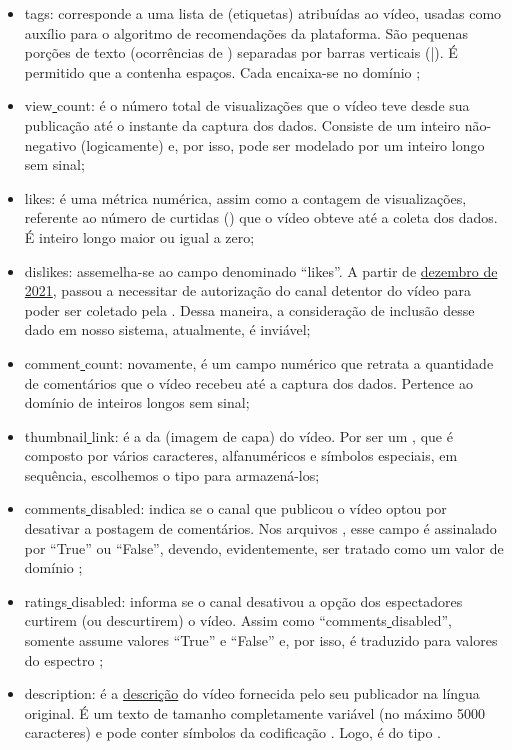 \begin{enumerate}
\begin{itemize}
    \item tags: corresponde a uma lista de  (etiquetas) atribuídas ao vídeo, usadas como auxílio para o algoritmo de recomendações da plataforma. São pequenas porções de texto (ocorrências de ) separadas por barras verticais (|). É permitido que a  contenha espaços. Cada  encaixa-se no domínio ;
    \item view\underline{ }count: é o número total de visualizações que o vídeo teve desde sua publicação até o instante da captura dos dados. Consiste de um inteiro não-negativo (logicamente) e, por isso, pode ser modelado por um inteiro longo sem sinal;
    \item likes: é uma métrica numérica, assim como a contagem de visualizações, referente ao número de curtidas () que o vídeo obteve até a coleta dos dados. É inteiro longo maior ou igual a zero;
    \item dislikes: assemelha-se ao campo denominado ``likes''. A partir de \href{https://developers.google.com/youtube/v3/docs/videos?hl=pt-br#statistics.dislikeCount}{dezembro de 2021}, passou a necessitar de autorização do canal detentor do vídeo para poder ser coletado pela . Dessa maneira, a consideração de inclusão desse dado em nosso sistema, atualmente, é inviável;
    \item comment\underline{ }count: novamente, é um campo numérico que retrata a quantidade de comentários que o vídeo recebeu até a captura dos dados. Pertence ao domínio de inteiros longos sem sinal;
    \item thumbnail\underline{ }link: é a  da  (imagem de capa) do vídeo. Por ser um , que é composto por vários caracteres, alfanuméricos e símbolos especiais, em sequência, escolhemos o tipo  para armazená-los;
    \item comments\underline{ }disabled: indica se o canal que publicou o vídeo optou por desativar a postagem de comentários. Nos arquivos , esse campo é assinalado por ``True'' ou ``False'', devendo, evidentemente, ser tratado como um valor de domínio ;
    \item  ratings\underline{ }disabled: informa se o canal desativou a opção dos espectadores curtirem (ou descurtirem) o vídeo. Assim como ``comments\underline{ }disabled'', somente assume valores ``True'' e ``False'' e, por isso, é traduzido para valores do espectro ;
    \item description: é a \href{https://developers.google.com/youtube/v3/docs/videos?hl=pt-br#snippet.description}{descrição} do vídeo fornecida pelo seu publicador na língua original. É um texto de tamanho completamente variável (no máximo 5000 caracteres) e pode conter símbolos da codificação . Logo, é do tipo .
  \end{itemize}


\end{enumerate}
